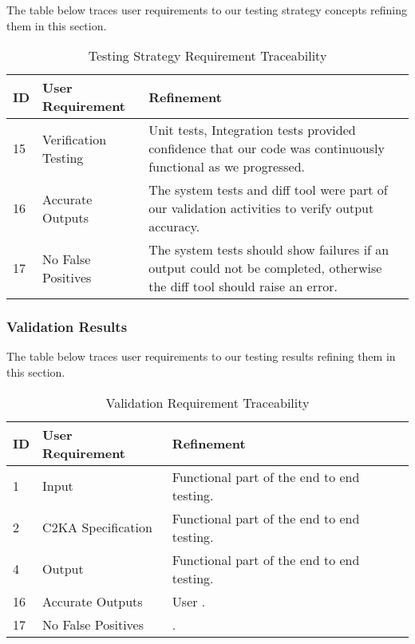 
The table below traces user requirements to our testing strategy concepts refining them in this section.
\begin{table}[htbp]
    \centering
    \caption{Testing Strategy Requirement Traceability}\label{tab:test-strat-table}
    \begin{tabularx}{\textwidth}{| l | l | X |}
        \hline
        \textbf{ID} & \textbf{User Requirement} & \textbf{Refinement} \\
        \hline
        15 & Verification Testing & Unit tests, Integration tests provided confidence that our code was continuously functional as we progressed. \\ \hline
        16 & Accurate Outputs & The system tests and diff tool were part of our validation activities to verify output accuracy. \\ \hline
        17 & No False Positives & The system tests should show failures if an output could not be completed, otherwise the diff tool should raise an error. \\ \hline
    \end{tabularx}
\end{table}
\newpage
\subsubsection{Validation Results}\label{subsubsec:test-validation}

The table below traces user requirements to our testing results refining them in this section.
\begin{table}[htbp]
    \centering
    \caption{Validation Requirement Traceability}\label{tab:test-res-table}
    \begin{tabularx}{\textwidth}{| l | l | X |}
        \hline
        \textbf{ID} & \textbf{User Requirement} & \textbf{Refinement} \\
        \hline
        1 & Input & Functional part of the end to end testing. \\ \hline
        2 & C2KA Specification & Functional part of the end to end testing.\\ \hline
        4 & Output & Functional part of the end to end testing.\\ \hline
        16 & Accurate Outputs & User . \\ \hline %
        17 & No False Positives & . \\ \hline %
    \end{tabularx}
\end{table}

